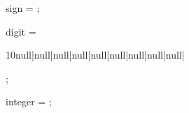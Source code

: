 \documentclass{article}
\begin{document}
    \begin{grammar}
    	sign =
    	 ;
    \end{grammar}
    \begin{grammar}
    	digit =
    	
    	 	10null|null|null|null|null|null|null|null|null|
    	
    	 ;
    \end{grammar}
    \begin{grammar}
    	integer =
    	 ;
    \end{grammar}
\end{document}
